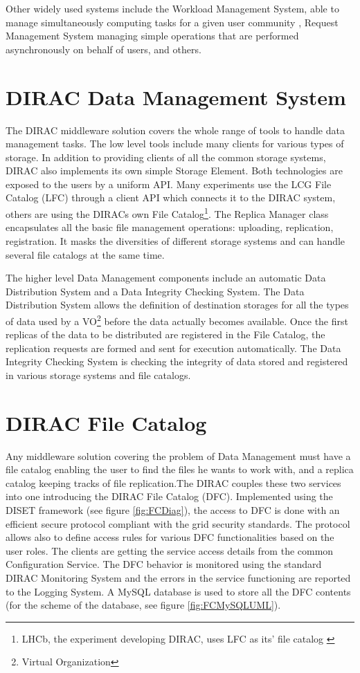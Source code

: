 Other widely used systems include the Workload Management System, able to manage simultaneously computing
tasks for a given user community \cite{WMS}, Request Management System \cite{RMS} managing simple operations that 
are performed asynchronously on behalf of users, and others. 

\section{DIRAC Data Management System}

The DIRAC middleware solution covers the whole range of tools to handle data management tasks. The low level 
tools include many clients for various types of storage. In addition to providing clients of all 
the common storage systems, DIRAC also implements its own simple Storage Element. Both technologies are 
exposed to the users by a uniform API. Many experiments use the LCG
File Catalog (LFC) through a client API which connects it to the DIRAC system, others are using 
the DIRACs own File Catalog\footnote{LHCb, the experiment developing DIRAC, uses LFC as its' file catalog 
\cite{LHCbFC}}. 
The Replica Manager class encapsulates all the basic file 
management operations: uploading, replication, registration. It masks the diversities 
of different storage systems and can handle several file catalogs at the same time. 

The higher level Data Management components include an automatic Data Distribution System and
a Data Integrity Checking System. The Data Distribution System allows the definition of destination storages
for all the types of data used by a VO\footnote{Virtual Organization} before the data actually becomes available. 
Once the first replicas
of the data to be distributed are registered in the File Catalog, the replication requests are formed and
sent for execution automatically. The Data Integrity Checking System is checking the integrity of data stored and
registered in various storage systems and file catalogs. 

\section{DIRAC File Catalog}

Any middleware solution covering the problem of Data Management must have a file catalog enabling the user to  
find the files he wants to work with, and a replica catalog keeping tracks of file replication.The DIRAC 
couples these two services into one introducing the DIRAC File Catalog (DFC)\cite{DFC}. 
Implemented using the DISET framework (see figure \ref{fig:FCDiag}), the access to DFC is done with an efficient secure 
protocol compliant with the grid security standards.
The protocol allows also to define access rules for various DFC functionalities based on the user roles. The
clients are getting the service access details from the common Configuration Service. The DFC behavior
is monitored using the standard DIRAC Monitoring System and the errors in the service functioning are
reported to the Logging System. A MySQL database is used to store all the DFC contents (for the scheme of the 
database, see figure \ref{fig:FCMySQLUML}). 

